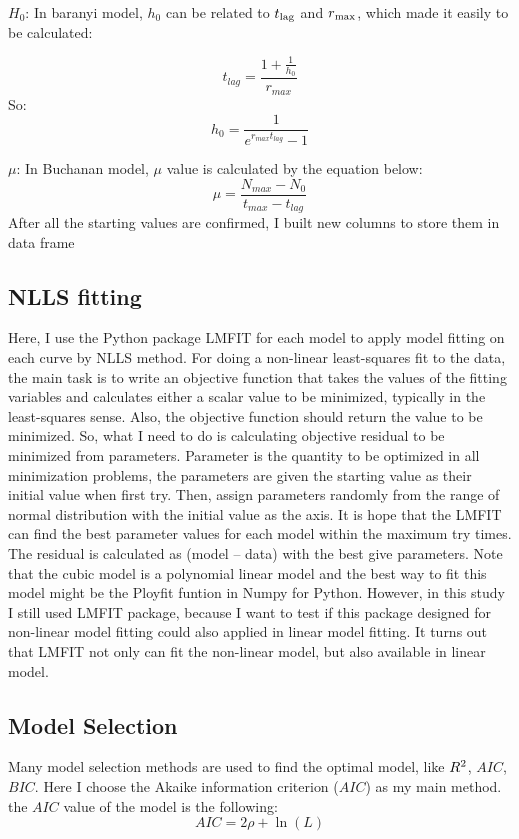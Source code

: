 \documentclass[11pt]{article}
\begin{document}
    $H_0$: In baranyi model, $h_0$ can be related to $t\textsubscript{lag}$ and $r\textsubscript{max}$, which made it easily to be calculated:
    
    \begin{equation}
	    t_{lag}= \frac{1+\frac{1}{h_0}}{r_{max}}
	\end{equation}
	So:
	\begin{equation}
	    h_0 = \frac{1}{e^{r_{max}t_{lag}}-1}
	\end{equation}
	
	$\mu$:  In Buchanan model, $\mu$ value is calculated by the equation below\citep{damert1994abacus}:
	\begin{equation}
	    \mu = \frac{N_{max}-N_0}{t_{max}-t_{lag}}
	\end{equation}
	After all the starting values are confirmed, I built new columns to store them in data frame
	
	\subsection{NLLS fitting}
	Here, I use the Python package LMFIT\citep{newville2016lmfit} for each model to apply model fitting on each curve by NLLS method. For doing a non-linear least-squares fit to the data, the main task is to write an objective function that takes the values of the fitting variables and calculates either a scalar value to be minimized, typically in the least-squares sense. Also, the objective function should return the value to be minimized. So, what I need to do is calculating objective residual to be minimized from parameters. Parameter is the quantity to be optimized in all minimization problems, the parameters are given the starting value as their initial value when first try. Then, assign parameters randomly from the range of normal distribution with the initial value as the axis. It is hope that the LMFIT can find the best parameter values for each model within the maximum try times. The residual is calculated as (model – data) with the best give parameters.
	Note that the cubic model is a polynomial linear model and the best way to fit this model might be the Ployfit funtion in Numpy for Python. However, in this study I still used LMFIT package, because I want to test if this package designed for non-linear model fitting could also applied in linear model fitting. It turns out that LMFIT not only can fit the non-linear model, but also available in linear model. 
	
	\subsection{Model Selection}
	Many model selection methods are used to find the optimal model, like $R\textsuperscript{2}$, $AIC$, $BIC$. Here I choose the Akaike information criterion ($AIC$) as my main method. the $AIC$ value of the model is the following:
    \begin{equation}
        AIC = 2\rho+\ln (L)
    \end{equation}
    
\end{document}

